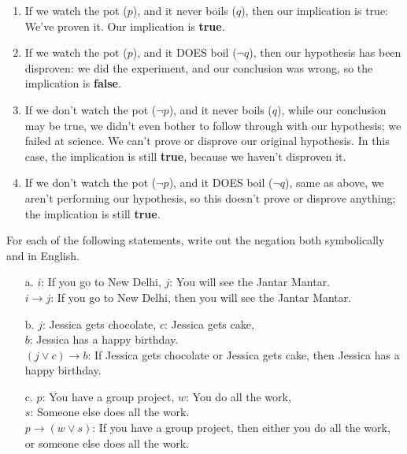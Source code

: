 \begin{introNOHEAD}
        \begin{enumerate}            
            \item If we watch the pot ($p$), and it never boils ($q$), then our implication is true:
                We've proven it. Our implication is \textbf{true}.
            \item If we watch the pot ($p$), and it DOES boil ($\neg q$), then our hypothesis has been disproven:
                we did the experiment, and our conclusion was wrong, so the implication is \textbf{false}.
            \item If we don't watch the pot ($\neg p$), and it never boils ($q$), while our conclusion
                may be true, we didn't even bother to follow through with our hypothesis; we failed at science.
                We can't prove or disprove our original hypothesis. In this case, the implication is
                still \textbf{true}, because we haven't disproven it.
            \item If we don't watch the pot ($\neg p$), and it DOES boil ($\neg q$), same as above,
                we aren't performing our hypothesis, so this doesn't prove or disprove anything;
                the implication is still \textbf{true}.
        \end{enumerate}
    \end{introNOHEAD}

    \newpage

    \begin{questionNOGRADE}{\thequestion}
        For each of the following statements, write out the negation
        both symbolically and in English.


        \begin{enumerate}
            \item[a.] $i$: If you go to New Delhi, $j$: You will see the Jantar Mantar. \\
                $i \to j$: If you go to New Delhi, then you will see the Jantar Mantar.
            \item[b.]
                $j$: Jessica gets chocolate,
                $c$: Jessica gets cake, \\
                $b$: Jessica has a happy birthday. \\
                $(j \lor c) \to b$: If Jessica gets chocolate or Jessica gets cake, then Jessica has a happy birthday.
            \item[c.]
                $p$: You have a group project, $w$: You do all the work, \\
                $s$: Someone else does all the work. \\
                $p \to (w \lor s)$: If you have a group project, then either you do all the work,
                    or someone else does all the work.
        \end{enumerate}        
    \end{questionNOGRADE}


